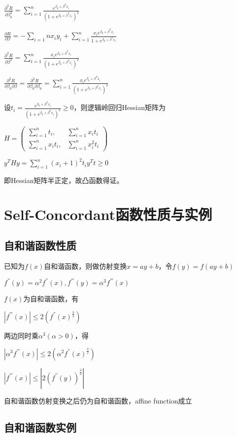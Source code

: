 \documentclass[12pt, a4paper, oneside, fontset=windows]{ctexart}
\begin{document}
$\frac {\partial^2 R }{\partial \beta_0^2} = \sum_{i = 1}^{n} \frac {e^{\beta_0 + \beta^Tx_i}}{(1+e^{\beta_0 + \beta^Tx_i})^2}$

$\frac{\partial R}{\partial \beta} = - \sum_{i = 1}{n}x_iy_i + \sum_{i = 1}^{n} \frac{x_ie^{\beta_0 + \beta^Tx_i}}{1+e^{\beta_0 + \beta^Tx_i}}$\

$\frac{\partial^2 R}{\partial \beta^2} = \sum_{i = 1}^{n} \frac{x_ie^{\beta_0 + \beta^Tx_i}}{(1+e^{\beta_0 + \beta^Tx_i})^2}$

$\frac{\partial^2 R}{\partial \beta_0 \partial \beta} = \frac{\partial^2 R}{\partial \beta_0 \partial \beta_0} = \sum_{i = 1}^{n} \frac {x_ie^{\beta_0 + \beta^Tx_i}}{(1+e^{\beta_0 + \beta^Tx_i})^2}$

设$t_i = \frac{e^{\beta_0 + \beta^Tx_i}}{(1+e^{\beta_0 + \beta^Tx_i})^2} \geq 0$，则逻辑岭回归Hessian矩阵为

$
H=
\begin{pmatrix}
  \sum_{i = 1}^{n} t_i  ,& \sum_{i=1}^{n} x_it_i\\ 
  \sum_{i =1}^{n} x_it_i ,& \sum_{i=1}^{n}x_i^2t_i
\end{pmatrix}
$

$y^THy = \sum_{i=1}^{n} (x_i +1)^2t_iy^Tt \geq 0$

即Hessian矩阵半正定，故凸函数得证。

\section{Self-Concordant函数性质与实例}
\subsection{自和谐函数性质}
已知为$f(x)$自和谐函数，则做仿射变换$x = ay+b$，令$f(y) = f(ay+b)$

$f^{''}(y) = \alpha^2f^{''}(x), f^{'''}(y) = \alpha^3f^{'''}(x)$

$f(x)$为自和谐函数，有

$|f^{'''}(x)| \leq 2(f^{''}(x)^{\frac{3}{2}})$

两边同时乘$\alpha^3 (\alpha > 0)$，得

$|\alpha^3 f^{'''}(x)| \leq 2(\alpha^2f^{''}(x)^{\frac{3}{2}})$

$|f^{'''}(x)| \leq |2(f^{''}(y))^{\frac {3}{2}}|$

自和谐函数仿射变换之后仍为自和谐函数，affine function成立
\subsection{自和谐函数实例}
\end{document}
